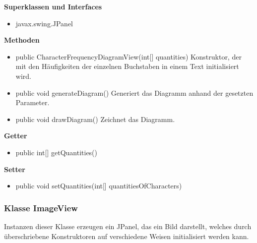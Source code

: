 \documentclass{article}
\begin{document}
      \textbf{Superklassen und Interfaces}
      \begin{itemize}
        \item javax.swing.JPanel
      \end{itemize}
	
      \textbf{Methoden}
      \begin{itemize}
        \item public CharacterFrequencyDiagramView(int[] quantities) \newline
          Konstruktor, der mit den Häufigkeiten der einzelnen Buchstaben in einem Text
          initialisiert wird.
        \item public void generateDiagram() \newline
          Generiert das Diagramm anhand der gesetzten Parameter.
        \item public void drawDiagram() \newline
          Zeichnet das Diagramm.
      \end{itemize}
      
      \textbf{Getter}
      \begin{itemize}
		\item public int[] getQuantities()
      \end{itemize}
      
      \textbf{Setter}
      \begin{itemize}
        \item public void setQuantities(int[] quantitiesOfCharacters)
      \end{itemize}
	
	\subsubsection{Klasse ImageView}
	  Instanzen dieser Klasse erzeugen ein JPanel, das ein Bild darstellt, welches
	  durch überschriebene Konstruktoren auf verschiedene Weisen initialisiert werden kann. 
	
\end{document}
